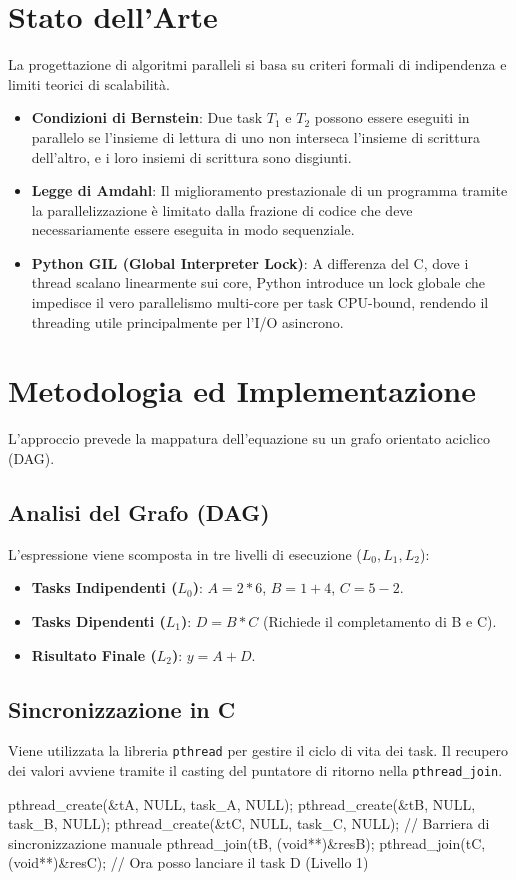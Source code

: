 \documentclass[a4paper,12pt]{article}
\begin{document}
\section{Stato dell'Arte}
La progettazione di algoritmi paralleli si basa su criteri formali di indipendenza e limiti teorici di scalabilità.
\begin{itemize}
    \item \textbf{Condizioni di Bernstein}: Due task $T_1$ e $T_2$ possono essere eseguiti in parallelo se l'insieme di lettura di uno non interseca l'insieme di scrittura dell'altro, e i loro insiemi di scrittura sono disgiunti.
    \item \textbf{Legge di Amdahl}: Il miglioramento prestazionale di un programma tramite la parallelizzazione è limitato dalla frazione di codice che deve necessariamente essere eseguita in modo sequenziale.
    \item \textbf{Python GIL (Global Interpreter Lock)}: A differenza del C, dove i thread scalano linearmente sui core, Python introduce un lock globale che impedisce il vero parallelismo multi-core per task CPU-bound, rendendo il threading utile principalmente per l'I/O asincrono.
\end{itemize}

\section{Metodologia ed Implementazione}
L'approccio prevede la mappatura dell'equazione su un grafo orientato aciclico (DAG).

\subsection{Analisi del Grafo (DAG)}
L'espressione viene scomposta in tre livelli di esecuzione ($L_0, L_1, L_2$):
\begin{itemize}
    \item \textbf{Tasks Indipendenti ($L_0$)}: $A=2*6$, $B=1+4$, $C=5-2$.
    \item \textbf{Tasks Dipendenti ($L_1$)}: $D=B*C$ (Richiede il completamento di B e C).
    \item \textbf{Risultato Finale ($L_2$)}: $y=A+D$.
\end{itemize}

\subsection{Sincronizzazione in C}
Viene utilizzata la libreria \texttt{pthread} per gestire il ciclo di vita dei task. Il recupero dei valori avviene tramite il casting del puntatore di ritorno nella \texttt{pthread_join}.
\begin{ccode}
pthread_create(&tA, NULL, task_A, NULL);
pthread_create(&tB, NULL, task_B, NULL);
pthread_create(&tC, NULL, task_C, NULL);
// Barriera di sincronizzazione manuale
pthread_join(tB, (void**)&resB);
pthread_join(tC, (void**)&resC);
// Ora posso lanciare il task D (Livello 1)
\end{ccode}
\end{document}

